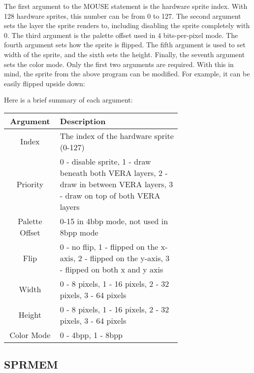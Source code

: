 The first argument to the {\ttfamily MOUSE} statement is the hardware sprite
index.  With 128 hardware sprites, this number can be from 0 to 127.  The
second argument sets the layer the sprite renders to, including disabling the
sprite completely with 0.  The third argument is the palette offset used in 4
bits-per-pixel mode.  The fourth argument sets how the sprite is flipped.  The
fifth argument is used to set width of the sprite, and the sixth sets the
height.  Finally, the seventh argument sets the color mode.  Only the first two
arguments are required.  With this in mind, the sprite from the above program
can be modified.  For example, it can be easily flipped upside down:\\


Here is a brief summary of each argument:\\

\begin{tabular}{|c|p{0.7\linewidth}|}
	\hline

	Argument & {\bfseries Description}\\ \hline

	Index & The index of the hardware sprite (0-127)\\ \hline

	Priority & 0 - disable sprite, 1 - draw beneath both VERA
	layers, 2 - draw in between VERA layers, 3 - draw on top of both VERA
	layers\\ \hline

	Palette Offset  & 0-15 in 4bbp mode, not used in 8bpp mode\\ \hline

	Flip & 0 - no flip, 1 - flipped on the x-axis, 2 - flipped on
	the y-axis, 3 - flipped on both x and y axis\\ \hline

	Width & 0 - 8 pixels, 1 - 16 pixels, 2 - 32 pixels, 3 - 64
	pixels\\ \hline

	Height & 0 - 8 pixels, 1 - 16 pixels, 2 - 32 pixels, 3 - 64
	pixels\\ \hline

	Color Mode & 0 - 4bpp, 1 - 8bpp\\ \hline

\end{tabular}

\subsection{SPRMEM}

